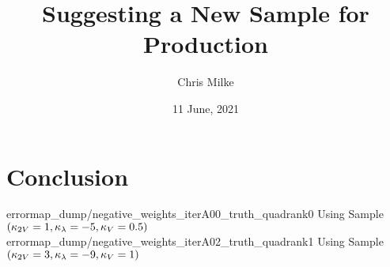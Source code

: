\documentclass{beamer}
\begin{document}
    \title{Suggesting a New Sample for Production}
    \author{Chris Milke}
    \date{11 June, 2021}

    \frame{\titlepage}

    
    
    

    \section{Conclusion}
    {errormap_dump/negative_weights_iterA00_truth_quadrank0}
    { Using Sample $(\kappa_{2V}=1, \kappa_{\lambda}=-5, \kappa_{V}=0.5)$ }
    {errormap_dump/negative_weights_iterA02_truth_quadrank1}
    { Using Sample $(\kappa_{2V}=3, \kappa_{\lambda}=-9, \kappa_{V}=1)$ }

    
    
    
    
    
    
\end{document}
